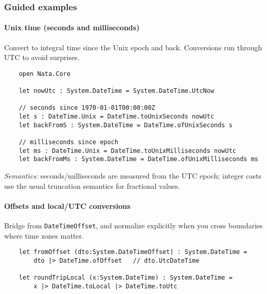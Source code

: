 \documentclass{article}
\begin{document}
\subsubsection{Guided examples}

\paragraph{Unix time (seconds and milliseconds)}
Convert to integral time since the Unix epoch and back. Conversions run through UTC to avoid surprises.
\begin{verbatim}
    open Nata.Core

    let nowUtc : System.DateTime = System.DateTime.UtcNow

    // seconds since 1970-01-01T00:00:00Z
    let s : DateTime.Unix = DateTime.toUnixSeconds nowUtc
    let backFromS : System.DateTime = DateTime.ofUnixSeconds s

    // milliseconds since epoch
    let ms : DateTime.Unix = DateTime.toUnixMilliseconds nowUtc
    let backFromMs : System.DateTime = DateTime.ofUnixMilliseconds ms
\end{verbatim}
\emph{Semantics:} seconds/milliseconds are measured from the UTC epoch; integer casts use the usual truncation semantics for fractional values.

\paragraph{Offsets and local/UTC conversions}
Bridge from \texttt{DateTimeOffset}, and normalize explicitly when you cross boundaries where time zones matter.
\begin{verbatim}
    let fromOffset (dto:System.DateTimeOffset) : System.DateTime =
        dto |> DateTime.ofOffset   // dto.UtcDateTime

    let roundTripLocal (x:System.DateTime) : System.DateTime =
        x |> DateTime.toLocal |> DateTime.toUtc
\end{verbatim}
\end{document}
